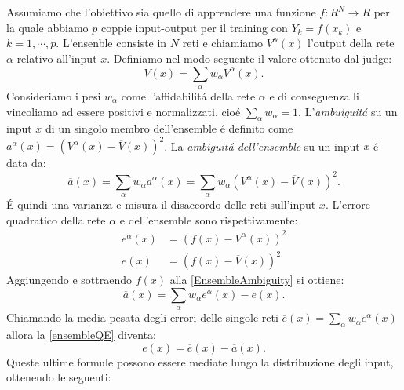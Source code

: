 \documentclass[a4paper,12pt]{report}
\begin{document}
 Assumiamo che l'obiettivo sia quello di apprendere una funzione $f:R^N\to R$ per la quale abbiamo $p$ coppie input-output per il training con $Y_k = f \left( x_k \right) $ e $k=1, \cdots , p$. 
 L'ensenble consiste in $N$ reti e chiamiamo $V^{\alpha}\left( x\right)$ l'output della rete $\alpha$ relativo all'input $x$. 
 Definiamo nel modo seguente il valore ottenuto dal judge: 
  \begin{equation}
   \overline{V}\left(x\right) = \sum_{\alpha} w_{\alpha} V^{\alpha}\left(x\right).
  \end{equation}
  Consideriamo i pesi $w_{\alpha}$ come l'affidabilit\'a della rete $\alpha$ e di conseguenza li vincoliamo ad essere positivi e normalizzati, cio\'e $\sum_{\alpha} w_{\alpha} = 1$. 
  L'\textit{ambuiguit\'a} su un input $x$ di un singolo membro dell'ensemble \'e definito come $a^{\alpha}\left(x\right)=\left(V^{\alpha}\left(x\right)-\overline{V}\left(x\right)\right)^2$. 
  La \textit{ambiguit\'a dell'ensemble} su un input $x$ \'e data da:
  \begin{equation}
   \overline{a}\left(x\right) = \sum_{\alpha} w_{\alpha} a^{\alpha}\left(x\right) = \sum_{\alpha} w_{\alpha}\left(V^{\alpha}\left(x\right)-\overline{V}\left(x\right)\right)^2. \label{EnsembleAmbiguity}
  \end{equation}
  \'E quindi una varianza e misura il disaccordo delle reti sull'input $x$. 
  L'errore quadratico della rete $\alpha$ e dell'ensemble sono rispettivamente:
  \begin{align}
   e^{\alpha}\left(x\right) &= \left(f\left(x\right)-V^{\alpha}\left(x\right)\right)^2 \\
   e\left(x\right) &= \left(f\left(x\right)-\overline{V}\left(x\right)\right)^2 \label{ensembleQE}
  \end{align}
  Aggiungendo e sottraendo $f\left(x\right)$ alla \ref{EnsembleAmbiguity} si ottiene:
  \begin{equation}
   \overline{a}\left(x\right) = \sum_{\alpha} w_{\alpha} e^{\alpha}\left(x\right) - e\left(x\right).
  \end{equation}
  Chiamando la media pesata degli errori delle singole reti $\overline{e}\left(x\right) = \sum_{\alpha} w_{\alpha} e^{\alpha}\left(x\right)$ allora la \ref{ensembleQE} diventa:
  \begin{equation}
   e\left(x\right) = \overline{e}\left(x\right) - \overline{a}\left(x\right). \label{GeneralizationError}
  \end{equation}
  Queste ultime formule possono essere mediate lungo la distribuzione degli input, ottenendo le seguenti:
\end{document}
